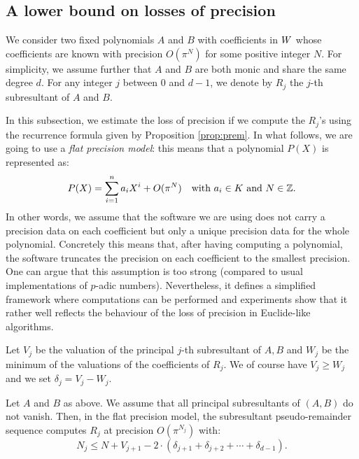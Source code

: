 \documentclass{article}
\begin{document}
\subsection{A lower bound on losses of precision}
\label{subsec:lowerbound}

We consider two fixed polynomials $A$ and $B$ with coefficients in $W$ 
whose coefficients are known with precision $O(\pi^N)$ for some positive
integer $N$. For simplicity, we assume further that $A$ and $B$ are both
monic and share the same degree $d$. 
For any integer $j$ between $0$ and $d-1$, we denote by $R_j$ the $j$-th 
subresultant of $A$ and $B$.

In this subsection, we estimate the loss of precision if we compute the 
$R_j$'s using the recurrence formula given by Proposition \ref{prop:prem}. 
In what follows, we are going to use a \emph{flat precision model}: this 
means that a polynomial $P(X)$ is represented as:
$$P(X) = \sum_{i=1}^n a_i X^i + O(\pi^N)
\quad \text{with } a_i \in K \text{ and } N \in \mathbb Z.$$
In other words, we assume that the software we are using does not
carry a precision data on each coefficient but only a unique precision
data for the whole polynomial. Concretely this means that, after having
computing a polynomial, the software truncates the precision on each
coefficient to the smallest precision. 
One can argue that this assumption is too strong (compared to usual
implementations of $p$-adic numbers). Nevertheless, it defines a 
simplified framework where computations can be performed and experiments 
show that it rather well reflects the behaviour of the loss of precision 
in Euclide-like algorithms.

Let $V_j$ be the valuation of the principal $j$-th subresultant of $A,B$ 
and $W_j$ be the minimum of the valuations of the coefficients of $R_j$. 
We of course have $V_j \geq W_j$ and we set $\delta_j = V_j - W_j$.

\begin{prop}
\label{prop:precEuclide}
Let $A$ and $B$ as above. We assume that all principal subresultants of 
$(A,B)$ do not vanish. Then, in the flat precision model, the 
subresultant pseudo-remainder sequence computes $R_j$ at precision 
$O(\pi^{N_j})$ with:
$$N_j \leq N + V_{j+1} - 2 \cdot (\delta_{j+1} + \delta_{j+2} + \cdots
+ \delta_{d-1}).$$
\end{prop}
\end{document}
